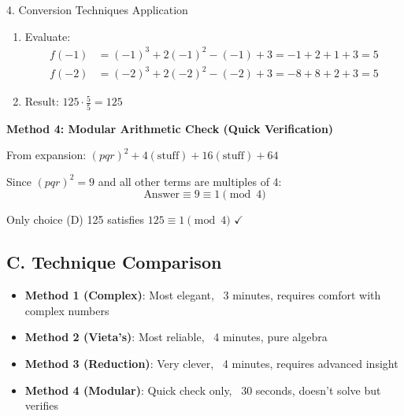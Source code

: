 \documentclass[12pt]{article}
\begin{document}
\begin{conversionbox}{4. Conversion Techniques Application}
\begin{enumerate}
    \item Evaluate:
    \begin{align*}
    f(-1) &= (-1)^3 + 2(-1)^2 - (-1) + 3 = -1 + 2 + 1 + 3 = 5\\
    f(-2) &= (-2)^3 + 2(-2)^2 - (-2) + 3 = -8 + 8 + 2 + 3 = 5
    \end{align*}
    
    \item Result: $125 \cdot \frac{5}{5} = 125$
\end{enumerate}

\textbf{Method 4: Modular Arithmetic Check (Quick Verification)}

From expansion: $(pqr)^2 + 4(\text{stuff}) + 16(\text{stuff}) + 64$

Since $(pqr)^2 = 9$ and all other terms are multiples of 4:
\[\text{Answer} \equiv 9 \equiv 1 \pmod{4}\]

Only choice (D) 125 satisfies $125 \equiv 1 \pmod{4}$ $\checkmark$

\subsection*{C. Technique Comparison}

\begin{itemize}
    \item \textbf{Method 1 (Complex)}: Most elegant, ~3 minutes, requires comfort with complex numbers
    \item \textbf{Method 2 (Vieta's)}: Most reliable, ~4 minutes, pure algebra
    \item \textbf{Method 3 (Reduction)}: Very clever, ~4 minutes, requires advanced insight
    \item \textbf{Method 4 (Modular)}: Quick check only, ~30 seconds, doesn't solve but verifies
\end{itemize}

\end{conversionbox}
\end{document}
